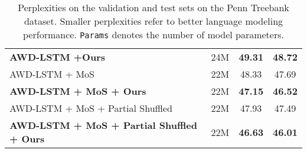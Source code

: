 \documentclass{article}
\begin{document}
\begin{table*}[ht]
\begin{center}
\begin{tabular}{l|c||cc}
            \bf{AWD-LSTM +Ours}  & 24M & \bf{49.31} & \bf{48.72}\\
AWD-LSTM + MoS 
            \citep{yang2017breaking}  & 22M & 48.33 & 47.69 \\
            \bf AWD-LSTM + MoS + Ours & 22M & \bf{47.15} & \bf{46.52} \\
            AWD-LSTM + MoS + Partial Shuffled \citep{press2019partially} & 22M & 47.93 & 47.49 \\
            \bf AWD-LSTM + MoS + Partial Shuffled + Ours & 22M & \bf{46.63} & \bf{46.01} \\
            \bottomrule
        \end{tabular}
    \end{center}
\caption{\label{PTB-table}
Perplexities on the validation and test sets on the Penn Treebank dataset.  Smaller perplexities refer to better language modeling performance. {\tt Params} denotes the number of model parameters. 
}
\end{table*}
\end{document}
